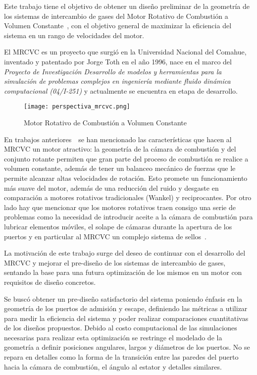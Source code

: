 Este trabajo tiene el objetivo de obtener un diseño preliminar de la geometría
de los sistemas de intercambio de gases del Motor Rotativo de Combustión a
Volumen Constante~\parencite{toth}, con el objetivo general de maximizar la
eficiencia del sistema en un rango de velocidades del motor.
%

El MRCVC es un proyecto que surgió en la Universidad Nacional del Comahue,
inventado y patentado por Jorge Toth en el año 1996, nace en el marco del
\emph{Proyecto de Investigación Desarrollo de modelos y herramientas para la
simulación de problemas complejos en ingeniería mediante fluido dinámica
computacional (04/I-251)} y actualmente se encuentra en etapa de desarrollo.

\begin{figure}
    \centering
    \texttt{[image: perspectiva\_mrcvc.png]}
    \caption{Motor Rotativo de Combustión a Volumen Constante}\label{fig:mrcvc}
\end{figure}

En trabajos anteriores~\parencite{lopez16,lopez13}~se han mencionado
las características que hacen al MRCVC un motor atractivo: la geometría de la
cámara de combustión y del conjunto rotante permiten que gran parte del proceso
de combustión se realice a volumen constante, además de tener un balanceo
mecánico de fuerzas que le permite alcanzar altas velocidades de rotación.
%
Esto promete un funcionamiento más suave del motor, además de una reducción del
ruido y desgaste en comparación a motores rotativos tradicionales (Wankel) y
reciprocantes.
%
Por otro lado hay que mencionar que los motores rotativos traen consigo una
serie de problemas como la necesidad de introducir aceite a la cámara de
combustión para lubricar elementos móviles, el solape de cámaras durante la
apertura de los puertos y en particular al MRCVC un complejo sistema de
sellos~\parencite{roldan}.


La motivación de este trabajo surge del deseo de continuar con el desarrollo del
MRCVC y mejorar el pre-diseño de los sistemas de intercambio de gases, sentando
la base para una futura optimización de los mismos en un motor con requisitos de
diseño concretos.


Se buscó obtener un pre-diseño satisfactorio del sistema poniendo énfasis en la
geometría de los puertos de admisión y escape, definiendo las métricas a
utilizar para medir la eficiencia del sistema y poder realizar comparaciones
cuantitativas de los diseños propuestos.
%
%
Debido al costo computacional de las simulaciones necesarias para realizar esta
optimización se restringe el modelado de la geometría a definir posiciones
angulares, largos y diámetros de los puertos.
%
No se repara en detalles como la forma de la transición entre las paredes del
puerto hacia la cámara de combustión, el ángulo al estator y detalles similares.

